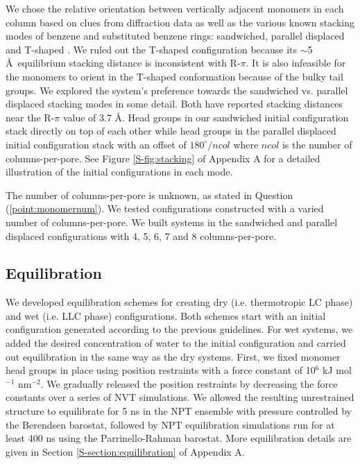   We chose the relative orientation between vertically adjacent monomers in each column 
  based on clues from diffraction data as well as the various known stacking modes of 
  benzene and substituted benzene rings: sandwiched, parallel displaced and T-shaped
  \cite{sinnokrot_estimates_2002}. We ruled out the T-shaped configuration
  because its $\sim$5 \AA~equilibrium stacking distance \cite{sinnokrot_estimates_2002}
  is inconsistent with R-$\pi$. It is also infeasible for the monomers to orient in the 
  T-shaped conformation because of the bulky tail groups. We explored the system's 
  preference towards the sandwiched vs. parallel displaced stacking modes in some detail.
  Both have reported stacking distances near the R-$\pi$ value of 3.7 \AA. Head groups in
  our sandwiched initial configuration stack directly on top of each other while
  head groups in the parallel displaced initial configuration stack with an offset
  of $180^\circ/ncol$ where $ncol$ is the number of columns-per-pore. See Figure 
  \ref{S-fig:stacking} of Appendix A for a detailed illustration 
  of the initial configurations in each mode.

  The number of columns-per-pore is unknown, as stated in Question
  (\ref{point:monomernum}). We tested configurations constructed with a varied
  number of columns-per-pore. We built systems in the sandwiched and parallel
  displaced configurations with 4, 5, 6, 7 and 8 columns-per-pore.

  \subsection{Equilibration}\label{section:equilibration}
  
  We developed equilibration schemes for creating dry (i.e. thermotropic LC phase)
  and wet (i.e. LLC phase) configurations.
  Both schemes start with an initial configuration generated according to the
  previous guidelines. For wet systems, we added the desired concentration of
  water to the initial configuration and carried out equilibration in the same
  way as the dry systems. First, we fixed monomer head groups in place using
  position restraints with a force constant of 10$^6$ kJ mol$^{-1}$ nm$^{-2}$. We
  gradually released the position restraints by decreasing the force constants
  over a series of NVT simulations. We allowed the resulting unrestrained
  structure to equilibrate for 5 ns in the NPT ensemble with pressure controlled
  by the Berendsen barostat, followed by NPT equilibration simulations run for at
  least 400 ns using the Parrinello-Rahman barostat. More equilibration details
  are given in Section \ref{S-section:equilibration} of Appendix A.

